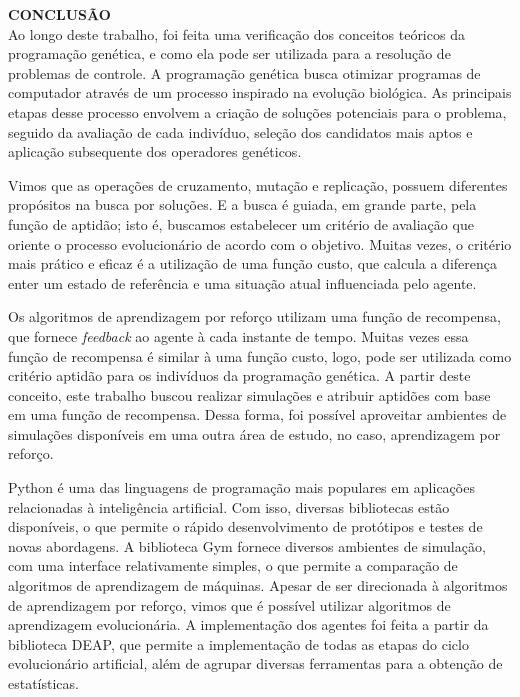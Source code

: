 \noindent\textbf{CONCLUSÃO}
$\!$\\

Ao longo deste trabalho, foi feita uma verificação dos conceitos teóricos da programação genética, e como ela pode ser utilizada para a resolução de problemas de controle. A programação genética busca otimizar programas de computador através de um processo inspirado na evolução biológica. As principais etapas desse processo envolvem a criação de soluções potenciais para o problema, seguido da avaliação de cada indivíduo, seleção dos candidatos mais aptos e aplicação subsequente dos operadores genéticos.

Vimos que as operações de cruzamento, mutação e replicação, possuem diferentes propósitos na busca por soluções. E a busca é guiada, em grande parte, pela função de aptidão; isto é, buscamos estabelecer um critério de avaliação que oriente o processo evolucionário de acordo com o objetivo. Muitas vezes, o critério mais prático e eficaz é a utilização de uma função custo, que calcula a diferença enter um estado de referência e uma situação atual influenciada pelo agente. 

Os algoritmos de aprendizagem por reforço utilizam uma função de recompensa, que fornece \textit{feedback} ao agente à cada instante de tempo. Muitas vezes essa função de recompensa é similar à uma função custo, logo, pode ser utilizada como critério aptidão para os indivíduos da programação genética. A partir deste conceito, este trabalho buscou realizar simulações e atribuir aptidões com base em uma função de recompensa. Dessa forma, foi possível aproveitar ambientes de simulações disponíveis em uma outra área de estudo, no caso, aprendizagem por reforço.

Python é uma das linguagens de programação mais populares em aplicações relacionadas à inteligência artificial. Com isso, diversas bibliotecas estão disponíveis, o que permite o rápido desenvolvimento de protótipos e testes de novas abordagens. A biblioteca Gym \cite{openaigym} fornece diversos ambientes de simulação, com uma interface relativamente simples, o que permite a comparação de algoritmos de aprendizagem de máquinas. Apesar de ser direcionada à algoritmos de aprendizagem por reforço, vimos que é possível utilizar algoritmos de aprendizagem evolucionária. A implementação dos agentes foi feita a partir da biblioteca DEAP, que permite a implementação de todas as etapas do ciclo evolucionário artificial, além de agrupar diversas ferramentas para a obtenção de estatísticas.

